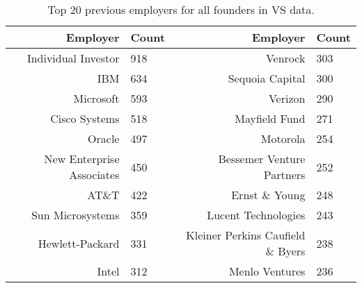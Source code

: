 \begin{table}[]
\centering
\begingroup\normalsize
\begin{tabular}{rlrl}
  \toprule
Employer & Count & Employer & Count \\ 
  \midrule
Individual Investor & 918 & Venrock & 303 \\ 
  IBM & 634 & Sequoia Capital & 300 \\ 
  Microsoft & 593 & Verizon & 290 \\ 
  Cisco Systems & 518 & Mayfield Fund & 271 \\ 
  Oracle & 497 & Motorola & 254 \\ 
  New Enterprise Associates & 450 & Bessemer Venture Partners & 252 \\ 
  AT\&T & 422 & Ernst \& Young & 248 \\ 
  Sun Microsystems & 359 & Lucent Technologies & 243 \\ 
  Hewlett-Packard & 331 & Kleiner Perkins Caufield \& Byers & 238 \\ 
  Intel & 312 & Menlo Ventures & 236 \\ 
   \bottomrule
\end{tabular}
\endgroup
\caption{Top 20 previous employers for all founders in VS data.} 
\label{table:VS_previousEmployersNoPositionsSummaryTable}
\end{table}
